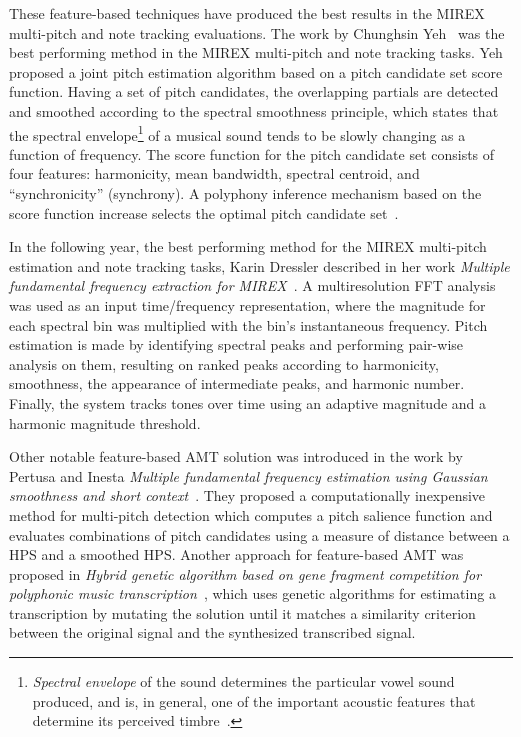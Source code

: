 These feature-based techniques have produced the best results in the \ac{MIREX}~\cite{mirex} multi-pitch and note
tracking evaluations. The work by Chunghsin Yeh~\cite{fundamental-frequency-estimation} was the best performing method in
the \ac{MIREX} multi-pitch and note tracking tasks. Yeh proposed a joint pitch estimation algorithm based on a pitch
candidate set score function. Having a set of pitch candidates, the overlapping partials are detected and smoothed
according to the spectral smoothness principle, which states that the spectral envelope\footnote{\textit{Spectral
envelope} of the sound determines the particular vowel sound produced, and is, in general, one of the important acoustic
features that determine its perceived timbre~\cite{kumar2007hierarchical}.} of a musical sound tends to be slowly
changing as a function of frequency. The score function for the pitch candidate set consists of four features:
harmonicity, mean bandwidth, spectral centroid, and ``synchronicity'' (synchrony). A polyphony inference mechanism based
on the score function increase selects the optimal pitch candidate set~\cite{fundamental-frequency-estimation}.

In the following year, the best performing method for the \ac{MIREX} multi-pitch estimation and note tracking tasks,
Karin Dressler described in her work \textit{Multiple fundamental frequency extraction for MIREX}~\cite{dressler2012multiple}.
A multiresolution \ac{FFT} analysis was used as an input time/frequency representation, where the magnitude for each
spectral bin was multiplied with the bin’s instantaneous frequency. Pitch estimation is made by identifying spectral
peaks and performing pair-wise analysis on them, resulting on ranked peaks according to harmonicity, smoothness,
the appearance of intermediate peaks, and harmonic number. Finally, the system tracks tones over time using an adaptive
magnitude and a harmonic magnitude threshold.

Other notable feature-based \ac{AMT} solution was introduced in the work by Pertusa and Inesta \textit{Multiple
fundamental frequency estimation using Gaussian smoothness and short context}~\cite{pertusa2008multiple}. They proposed
a computationally inexpensive method for multi-pitch detection which computes a pitch salience function and evaluates
combinations of pitch candidates using a measure of distance between a \ac{HPS} and a smoothed \ac{HPS}. Another
approach for feature-based \ac{AMT} was proposed in \textit{Hybrid genetic algorithm based on gene fragment competition
for polyphonic music transcription}~\cite{reis2008hybrid}, which uses genetic algorithms for estimating a transcription
by mutating the solution until it matches a similarity criterion between the original signal and the synthesized
transcribed signal.

